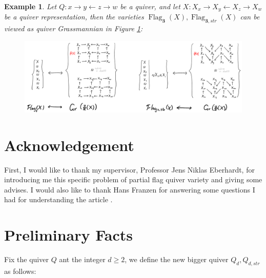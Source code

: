 \documentclass[reqno,11pt]{amsart}
\numberwithin{equation}{section}
\theoremstyle{plain}
\newtheorem{eg}[theorem]{Example}
\theoremstyle{plain}
\numberwithin{equation}{section}
\theoremstyle{remark}
\newcommand{\Flag}[1]{\operatorname{Flag}_{\mathbf{#1}}}
\newcommand{\Flagstr}[1]{\operatorname{Flag}_{\mathbf{#1},str}}
\begin{document}
\begin{eg}
Let $Q\colon x \longrightarrow y \longleftarrow z \longrightarrow w$ be a quiver, and let $X\colon X_x \longrightarrow X_y \longleftarrow X_z \longrightarrow X_w$ be a quiver representation, then the varieties $\Flag{3}(X),\Flagstr{3}(X)$ can be viewed as quiver Grassmannian in Figure \ref{fig:flagasgr}:
\begin{center}
	\begin{figure}[ht]
		\vspace{0cm}
		\centering
		\includegraphics[width=15cm]{figures/flagasgr.png}
		\caption{}
		\label{fig:flagasgr}
	\end{figure}
\end{center}


\end{eg}
\section*{Acknowledgement}
First, I would like to thank my supervisor, Professor Jens Niklas Eberhardt, for introducing me this specific problem of partial flag quiver variety and giving some advises. I would also like to thank Hans Franzen for answering some questions I had for understanding the article \cite{irelli2019cell}.
\section{Preliminary Facts}\label{sec:flag=gr}
Fix the quiver $Q$ ant the integer $d \geqslant 2$, we define the new bigger quiver $Q_{d},Q_{d,str}$ as follows:
\end{document}
